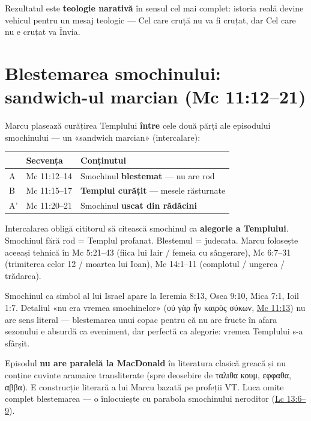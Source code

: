 \documentclass[12pt,a4paper,twoside,openany]{book}
\begin{document}
Rezultatul este \textbf{teologie narativă} în sensul cel mai complet: istoria reală devine vehicul pentru un mesaj teologic — Cel care cruță nu va fi cruțat, dar Cel care nu e cruțat va Învia.

\section{Blestemarea smochinului: sandwich-ul marcian (Mc 11:12--21)}

Marcu plasează curățirea Templului \textbf{între} cele două părți ale episodului smochinului — un «sandwich marcian» (intercalare):

\begin{center}
\small
\begin{tabularx}{\textwidth}{C{1cm}L{3.5cm}X}
\toprule
{}
& \textbf{Secvența} & \textbf{Conținutul} \\
\midrule
A & Mc 11:12--14 & Smochinul \textbf{blestemat} — nu are rod \\
B & Mc 11:15--17 & \textbf{Templul curățit} — mesele răsturnate \\
A' & Mc 11:20--21 & Smochinul \textbf{uscat din rădăcini} \\
\bottomrule
\end{tabularx}
\end{center}

Intercalarea obligă cititorul să citească smochinul ca \textbf{alegorie a Templului}. Smochinul fără rod = Templul profanat. Blestemul = judecata. Marcu folosește aceeași tehnică în Mc 5:21--43 (fiica lui Iair / femeia cu sângerare), Mc 6:7--31 (trimiterea celor 12 / moartea lui Ioan), Mc 14:1--11 (complotul / ungerea / trădarea).

Smochinul ca simbol al lui Israel apare la Ieremia 8:13, Osea 9:10, Mica 7:1, Ioil 1:7. Detaliul «nu era vremea smochinelor» (οὐ γὰρ ἦν καιρὸς σύκων, \href{https://bibliaortodoxa.ro/carte.php?id=53\&cap=11\#13}{Mc 11:13}) nu are sens literal — blestemarea unui copac pentru că nu are fructe în afara sezonului e absurdă ca eveniment, dar perfectă ca alegorie: vremea Templului s-a sfârșit.

Episodul \textbf{nu are paralelă la MacDonald} în literatura clasică greacă și nu conține cuvinte aramaice transliterate (spre deosebire de ταλιθα κουμ, εφφαθα, αββα). E construcție literară a lui Marcu bazată pe profeții VT. Luca omite complet blestemarea — o înlocuiește cu parabola smochinului neroditor (\href{https://bibliaortodoxa.ro/carte.php?id=48\&cap=13\#6}{Lc 13:6--9}).
\end{document}

